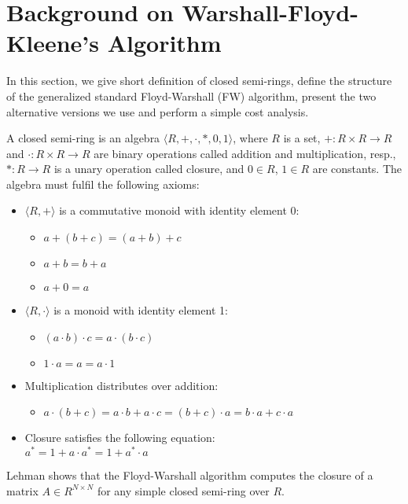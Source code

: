 \section{Background on Warshall-Floyd-Kleene's Algorithm}\label{sec:background}

In this section, we give short definition of closed semi-rings, define the structure of the
generalized standard Floyd-Warshall (FW) algorithm, present the two alternative versions we use
and perform a simple cost analysis.

A closed semi-ring is an algebra $\langle R,+,\cdot,*,0,1\rangle$, where $R$ is a set,
$+: R \times R \rightarrow R$ and $\cdot: R \times R \rightarrow R$ are binary operations
called addition and multiplication, resp., $*: R \rightarrow R$ is a unary operation
called closure, and $0 \in R$, $1 \in R$ are constants. The algebra must fulfil the
following axioms:
\begin{itemize}
    \item $\langle R, + \rangle$ is a commutative monoid with identity element 0:
            \begin{itemize}[noitemsep,topsep=0pt]
                \item $a + (b + c) = (a + b) + c$
                \item $a + b = b + a$
                \item $a + 0 = a$
            \end{itemize}
    \item $\langle R, \cdot \rangle$ is a monoid with identity element 1:
             \begin{itemize}[noitemsep,topsep=0pt]
                 \item $(a \cdot b) \cdot c = a \cdot (b \cdot c)$
                 \item $1 \cdot a = a = a \cdot 1$
             \end{itemize}
    \item Multiplication distributes over addition:
            \begin{itemize}[noitemsep,topsep=0pt]
                \item $a \cdot (b + c) = a \cdot b + a \cdot c = (b + c) \cdot a = b \cdot a + c \cdot a$
            \end{itemize}
    \item Closure satisfies the following equation:\\
        $a^* = 1 + a \cdot a^* = 1 + a^* \cdot a$
\end{itemize}
Lehman \cite{lehmann77algebraic} shows that the
Floyd-Warshall algorithm computes the closure of a matrix $A \in R^{N \times N}$
for any simple closed semi-ring over $R$. 

